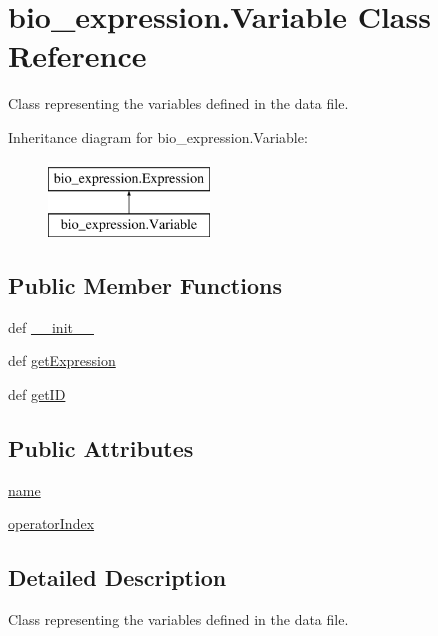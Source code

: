 \hypertarget{classbio__expression_1_1_variable}{\section{bio\+\_\+expression.\+Variable Class Reference}
\label{classbio__expression_1_1_variable}
}


Class representing the variables defined in the data file.  


Inheritance diagram for bio\+\_\+expression.\+Variable\+:\begin{figure}[H]
\begin{center}
\leavevmode
\includegraphics[height=2.000000cm]{d7/d00/classbio__expression_1_1_variable}
\end{center}
\end{figure}
\subsection*{Public Member Functions}
\begin{DoxyCompactItemize}
\item 
def \hyperlink{classbio__expression_1_1_variable_a89bacb729af0db4173f6a6d184a8306a}{\+\_\+\+\_\+init\+\_\+\+\_\+}
\item 
def \hyperlink{classbio__expression_1_1_variable_acf2a219b0a46f301a987deff7c5c8b5f}{get\+Expression}
\item 
def \hyperlink{classbio__expression_1_1_variable_a9ef8b57f53676db461e5ab88a90c893f}{get\+I\+D}
\end{DoxyCompactItemize}
\subsection*{Public Attributes}
\begin{DoxyCompactItemize}
\item 
\hyperlink{classbio__expression_1_1_variable_a58b8146722379546bf5bce3c39b549cd}{name}
\item 
\hyperlink{classbio__expression_1_1_variable_a5dd1818c0fe6bdb02a267a923aad2697}{operator\+Index}
\end{DoxyCompactItemize}


\subsection{Detailed Description}
Class representing the variables defined in the data file. 

